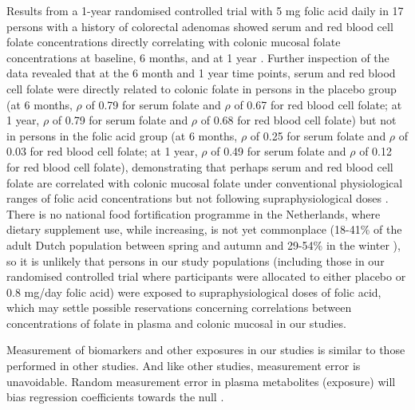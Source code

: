 \noindent Results from a 1-year randomised controlled trial with 5 mg folic acid daily in 17 persons with a history of colorectal adenomas showed serum and red blood cell folate concentrations directly correlating with colonic mucosal folate concentrations at baseline, 6 months, and at 1 year \cite{c735}. Further inspection of the data revealed that at the 6 month and 1 year time points, serum and red blood cell folate were directly related to colonic folate in persons in the placebo group (at 6 months, $\rho$ of 0.79 for serum folate and $\rho$ of 0.67 for red blood cell folate; at 1 year, $\rho$ of 0.79 for serum folate and $\rho$ of 0.68 for red blood cell folate) but not in persons in the folic acid group (at 6 months, $\rho$ of 0.25 for serum folate and $\rho$ of 0.03 for red blood cell folate; at 1 year, $\rho$ of 0.49 for serum folate and $\rho$ of 0.12 for red blood cell folate), demonstrating that perhaps serum and red blood cell folate are correlated with colonic mucosal folate under conventional physiological ranges of folic acid concentrations but not following supraphysiological doses \cite{c735}. There is no national food fortification programme in the Netherlands, where dietary supplement use, while increasing, is not yet commonplace (18-41\% of the adult Dutch population between spring and autumn and 29-54\% in the winter \cite{c720}), so it is unlikely that persons in our study populations (including those in our randomised controlled trial where participants were allocated to either placebo or 0.8 mg/day folic acid) were exposed to supraphysiological doses of folic acid, which may settle possible reservations concerning correlations between concentrations of folate in plasma and colonic mucosal in our studies.

\noindent Measurement of biomarkers and other exposures in our studies is similar to those performed in other studies. And like other studies, measurement error is unavoidable. Random measurement error in plasma metabolites (exposure) will bias regression coefficients towards the null \cite{c743,c744}.
 
